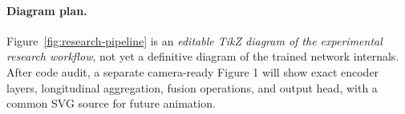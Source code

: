 \paragraph{Diagram plan.} Figure~\ref{fig:research-pipeline} is an \emph{editable TikZ diagram of the experimental research workflow}, not yet a definitive diagram of the trained network internals. After code audit, a separate camera-ready Figure 1 will show exact encoder layers, longitudinal aggregation, fusion operations, and output head, with a common SVG source for future animation.


